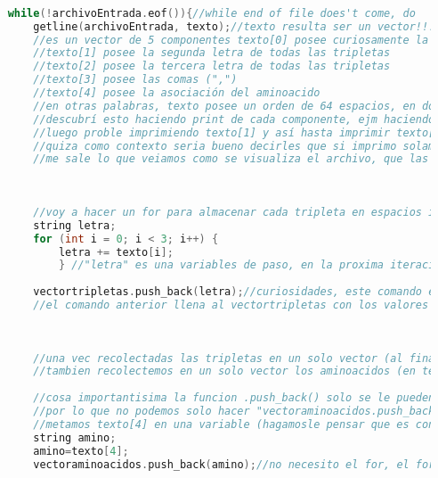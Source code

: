 \documentclass[12pt,letterpaper]{report}
\begin{document}
\begin{lstlisting}[language=c++]
	
	
    while(!archivoEntrada.eof()){//while end of file does't come, do
		getline(archivoEntrada, texto);//texto resulta ser un vector!!!!!!!
		//es un vector de 5 componentes texto[0] posee curiosamente la primera letra de todas las tripletas
		//texto[1] posee la segunda letra de todas las tripletas
		//texto[2] posee la tercera letra de todas las tripletas
		//texto[3] posee las comas (",")
		//texto[4] posee la asociación del aminoacido
		//en otras palabras, texto posee un orden de 64 espacios, en donde guarda de forma vertical las columnas del archivo datos.csv
		//descubrí esto haciendo print de cada componente, ejm haciendo cout<< texto[0] <<endl; 
		//luego proble imprimiendo texto[1] y así hasta imprimir texto[4], magia??
		//quiza como contexto seria bueno decirles que si imprimo solamente texto cout<< texto <<endl;
		//me sale lo que veiamos como se visualiza el archivo, que las columnas se dividian por "," y luego se hacia "\n" y se mostraba la siguiente fila... hasta mostrar todo el archivo datos.csv
		
		
		
		//voy a hacer un for para almacenar cada tripleta en espacios individuales dentro del vector
		string letra;
		for (int i = 0; i < 3; i++) {
			letra += texto[i];
			} //"letra" es una variables de paso, en la proxima iteracion de while se reescribirá, ocupo guardar su valor en cada iteracion (64 iteraciones)
		
		vectortripletas.push_back(letra);//curiosidades, este comando es como el append usado en python, permite agregar cosas al vector
		//el comando anterior llena al vectortripletas con los valores de letra (recordar, "letra" se reescribe en cada iteracion)
		
		
		
		//una vec recolectadas las tripletas en un solo vector (al final del while)
		//tambien recolectemos en un solo vector los aminoacidos (en texto[4] se encuentran)
		
		//cosa importantisima la funcion .push_back() solo se le pueden ingresar valores constantes
		//por lo que no podemos solo hacer "vectoraminoacidos.push_back(texto[4]);" porque tira error diciendo de que debe recibir una constante
		//metamos texto[4] en una variable (hagamosle pensar que es constante)--->(delicadeses de c++)
		string amino;
		amino=texto[4];
		vectoraminoacidos.push_back(amino);//no necesito el for, el for servia para recolertar las tres letras que forman la tripleta (union de 3 caracteres)
		

\end{lstlisting}
\end{document}
